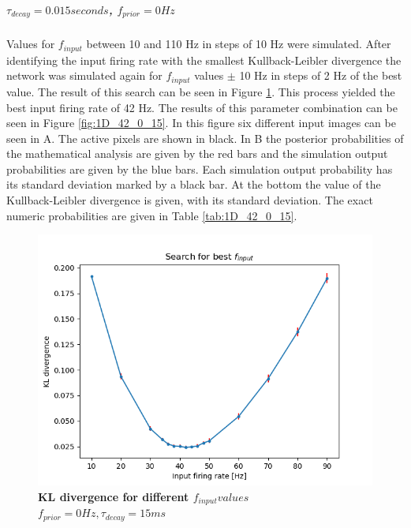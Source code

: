 \subparagraph{$\tau_{decay} = 0.015 seconds$, $f_{prior} = 0 Hz$}
Values for $f_{input}$ between 10 and 110 Hz in steps of 10 Hz were simulated. After identifying the input firing rate with the smallest Kullback-Leibler divergence the network was simulated again for $f_{input}$ values $\pm$ 10 Hz in steps of 2 Hz of the best value. The result of this search can be seen in Figure \ref{fig:1D_KLD_fPrior0_tau15}. This process yielded the best input firing rate of 42 Hz. The results of this parameter combination can be seen in Figure \ref{fig:1D_42_0_15}. In this figure six different input images can be seen in A. The active pixels are shown in black. In B the posterior probabilities of the mathematical analysis are given by the red bars and the simulation output probabilities are given by the blue bars. Each simulation output probability has its standard deviation marked by a black bar. At the bottom the value of the Kullback-Leibler divergence is given, with its standard deviation. The exact numeric probabilities are given in Table \ref{tab:1D_42_0_15}.

\begin{figure}
  \includegraphics[width=\linewidth]{figures/1D/KLDvsfInput_fPrior0tau15.png}
  \caption{\textbf{KL divergence for different $f_{input} values$} $f_{prior} = 0 Hz, \tau_{decay} = 15 ms$}
  \label{fig:1D_KLD_fPrior0_tau15}
\end{figure}

